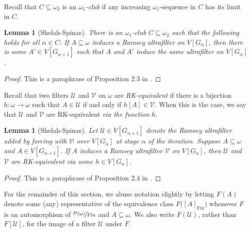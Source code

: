 \documentclass[11pt,leqno]{amsart}
\newtheorem{lemma}[theorem]{Lemma}
\theoremstyle{definition}
\theoremstyle{remark}
\newcommand{\U}{\mathcal{U}}
\newcommand{\V}{\mathcal{V}}
\newcommand{\<}{\langle}
\renewcommand{\>}{\rangle}
\renewcommand{\a}{\alpha}
\newcommand{\w}{\omega}
\newcommand{\0}{\emptyset}
\newcommand{\sub}{\subseteq}
\newcommand{\1}{1\hspace{-1.75mm}1}
\newcommand{\pwmf}{\nicefrac{\mathcal{P}(\w)}{\mathrm{Fin}}}
\newcommand{\M}{\mathbb{M}}
\begin{document}
Recall that $C \sub \w_2$ is an $\w_1$\emph{-club} if any increasing $\w_1$-sequence in $C$ has its limit in $C$.

\begin{lemma}[Shelah-Spinas]\label{lem:ShSp1}
There is an $\w_1$-club $C \sub \w_2$ such that the following holds for all $\a \in C$: 
If $A \sub \w$ induces a Ramsey ultrafilter on $V[G_\a]$, then there is some $A' \in V[G_{\a+1}]$ such that $A$ and $A'$ induce the same ultrafilter on $V[G_\a]$. 
\end{lemma}
\begin{proof}
This is a paraphrase of Proposition 2.3 in \cite{ShelahSpinas}. 
\end{proof}

Recall that two filters $\U$ and $\V$ on $\w$ are \emph{RK-equivalent} if there is a bijection $h: \w \to \w$ such that $A \in \U$ if and only if $h[A] \in \V$. 
When this is the case, we say that $\U$ and $\V$ are RK-equivalent \emph{via the function $h$}.

\begin{lemma}[Shelah-Spinas]\label{lem:ShSp2}
Let $\U \in V[G_{\a+1}]$ denote the Ramsey ultrafilter added by forcing with $\M$ over $V[G_\a]$ at stage $\a$ of the iteration. 
Suppose $A \sub \w$ and $A \in V[G_{\a+1}]$. 
If $A$ induces a Ramsey ultrafilter $\mathcal V$ on $V[G_\a]$, then $\mathcal U$ and $\mathcal V$ are RK-equivalent via some $h \in V[G_\a]$. 
\end{lemma}
\begin{proof}
This is a paraphrase of Proposition 2.4 in \cite{ShelahSpinas}. 
\end{proof}

For the remainder of this section, we abuse notation slightly by letting $F(A)$ denote some (any) representative of the equivalence class  $F\big( [A]_{\mathrm{Fin}} \big)$ whenever $F$ is an automorphism of $\pwmf$ and $A \sub \w$. We also write $F(\U)$, rather than $F[\U]$, for the image of a filter $\U$ under $F$.
\end{document}
